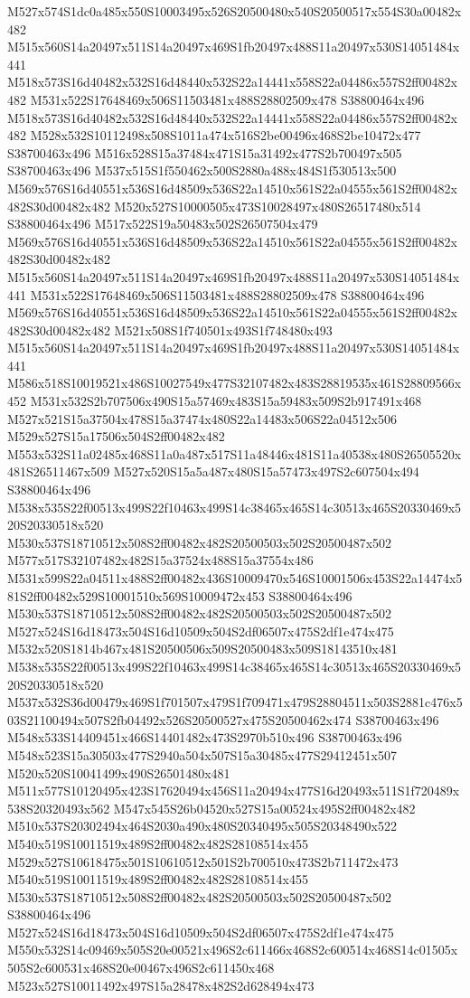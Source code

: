 \documentclass{article}
\begin{document}
\begin{multicols}{2}
M527x574S1dc0a485x550S10003495x526S20500480x540S20500517x554S30a00482x482 M515x560S14a20497x511S14a20497x469S1fb20497x488S11a20497x530S14051484x441 M518x573S16d40482x532S16d48440x532S22a14441x558S22a04486x557S2ff00482x482 M531x522S17648469x506S11503481x488S28802509x478 S38800464x496 M518x573S16d40482x532S16d48440x532S22a14441x558S22a04486x557S2ff00482x482 M528x532S10112498x508S1011a474x516S2be00496x468S2be10472x477 S38700463x496 M516x528S15a37484x471S15a31492x477S2b700497x505 S38700463x496 M537x515S1f550462x500S2880a488x484S1f530513x500 M569x576S16d40551x536S16d48509x536S22a14510x561S22a04555x561S2ff00482x482S30d00482x482 M520x527S10000505x473S10028497x480S26517480x514 S38800464x496 M517x522S19a50483x502S26507504x479 M569x576S16d40551x536S16d48509x536S22a14510x561S22a04555x561S2ff00482x482S30d00482x482 M515x560S14a20497x511S14a20497x469S1fb20497x488S11a20497x530S14051484x441 M531x522S17648469x506S11503481x488S28802509x478 S38800464x496 M569x576S16d40551x536S16d48509x536S22a14510x561S22a04555x561S2ff00482x482S30d00482x482 M521x508S1f740501x493S1f748480x493 M515x560S14a20497x511S14a20497x469S1fb20497x488S11a20497x530S14051484x441 M586x518S10019521x486S10027549x477S32107482x483S28819535x461S28809566x452 M531x532S2b707506x490S15a57469x483S15a59483x509S2b917491x468 M527x521S15a37504x478S15a37474x480S22a14483x506S22a04512x506 M529x527S15a17506x504S2ff00482x482 M553x532S11a02485x468S11a0a487x517S11a48446x481S11a40538x480S26505520x481S26511467x509 M527x520S15a5a487x480S15a57473x497S2c607504x494 S38800464x496 M538x535S22f00513x499S22f10463x499S14c38465x465S14c30513x465S20330469x520S20330518x520 M530x537S18710512x508S2ff00482x482S20500503x502S20500487x502 M577x517S32107482x482S15a37524x488S15a37554x486 M531x599S22a04511x488S2ff00482x436S10009470x546S10001506x453S22a14474x581S2ff00482x529S10001510x569S10009472x453 S38800464x496 M530x537S18710512x508S2ff00482x482S20500503x502S20500487x502 M527x524S16d18473x504S16d10509x504S2df06507x475S2df1e474x475 M532x520S1814b467x481S20500506x509S20500483x509S18143510x481 M538x535S22f00513x499S22f10463x499S14c38465x465S14c30513x465S20330469x520S20330518x520 M537x532S36d00479x469S1f701507x479S1f709471x479S28804511x503S2881c476x503S21100494x507S2fb04492x526S20500527x475S20500462x474 S38700463x496 M548x533S14409451x466S14401482x473S2970b510x496 S38700463x496 M548x523S15a30503x477S2940a504x507S15a30485x477S29412451x507 M520x520S10041499x490S26501480x481 M511x577S10120495x423S17620494x456S11a20494x477S16d20493x511S1f720489x538S20320493x562 M547x545S26b04520x527S15a00524x495S2ff00482x482 M510x537S20302494x464S2030a490x480S20340495x505S20348490x522 M540x519S10011519x489S2ff00482x482S28108514x455 M529x527S10618475x501S10610512x501S2b700510x473S2b711472x473 M540x519S10011519x489S2ff00482x482S28108514x455 M530x537S18710512x508S2ff00482x482S20500503x502S20500487x502 S38800464x496 M527x524S16d18473x504S16d10509x504S2df06507x475S2df1e474x475 M550x532S14c09469x505S20e00521x496S2c611466x468S2c600514x468S14c01505x505S2c600531x468S20e00467x496S2c611450x468 M523x527S10011492x497S15a28478x482S2d628494x473 
\end{multicols}
\end{document}
